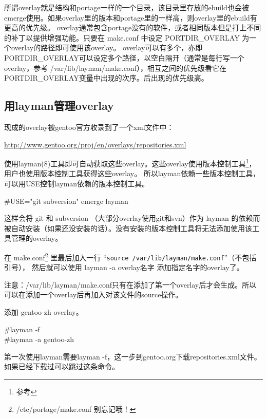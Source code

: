 所谓overlay就是结构和portage一样的一个目录，该目录里存放的ebuild也会被emerge使用。如果overlay里的版本和portage里的一样高，则overlay里的ebuild有更高的优先级。
overlay通常包含portage没有的软件，或者相同版本但是打上不同的补丁以提供增强功能。只要在 make.conf 中设定 PORTDIR\_OVERLAY 为一个overlay的路径即可使用该overlay。
overlay可以有多个，亦即PORTDIR\_OVERLAY可以设定多个路径，以空白隔开（通常是每行写一个overlay，参考 /var/lib/layman/make.conf），相互之间的优先级看它在PORTDIR\_OVERLAY变量中出现的次序。后出现的优先级高。

\subsection{用layman管理overlay}

现成的overlay被gentoo官方收录到了一个xml文件中：

\url{http://www.gentoo.org/proj/en/overlays/repositories.xml}

使用layman(8)工具即可自动获取这些overlay。这些overlay使用版本控制工具\footnote{参考 }，用户也使用版本控制工具获得这些overlay。
所以layman依赖一些版本控制工具，可以用USE控制layman依赖的版本控制工具。

\begin{code}
\#USE="git subversion" emerge layman
\end{code}

这样会将 git 和 subversion （大部分overlay使用git和svn）作为 layman 的依赖而被自动安装（如果还没安装的话）。没有安装的版本控制工具将无法添加使用该工具管理的overlay。

在 make.conf\footnote{ /etc/portage/make.conf 别忘记哦！} 里最后加入一行 “{\tt source /var/lib/layman/make.conf}”（不包括引号）， 然后就可以使用 layman -a overlay名字 添加指定名字的overlay了。

\begin{insertnote}
注意：/var/lib/layman/make.conf只有在添加了第一个overlay后才会生成。所以可以在添加一个overlay后再加入对该文件的source操作。
\end{insertnote}

\begin{example}{添加 gentoo-zh overlay。}
\begin{code}
\#layman -f \\
\#layman -a gentoo-zh
\end{code}

第一次使用layman需要layman -f，这一步到gentoo.org下载repositories.xml文件。如果已经下载过可以跳过这条命令。

\end{example}

